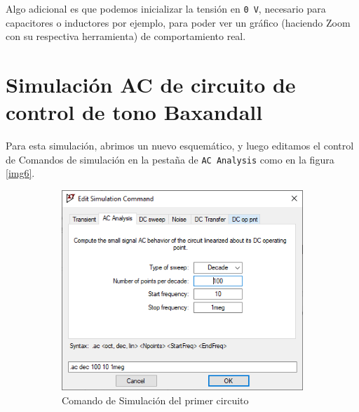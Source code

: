 \documentclass[a4paper]{article} %
\begin{document}
Algo adicional es que podemos inicializar la tensión en \texttt{0 V}, necesario para capacitores o inductores por ejemplo, para poder ver un gráfico (haciendo Zoom con su respectiva herramienta) de comportamiento real.


\section{Simulación AC de circuito de control de tono Baxandall}




Para esta simulación, abrimos un nuevo esquemático, y luego editamos el control de Comandos de simulación en la pestaña de \texttt{AC Analysis} como en la figura \eqref{img6}.

\begin{figure}
	\centering
	\begin{subfigure}[b]{0.45\textwidth}
		\centering %
		\includegraphics[scale=0.5]{IMAGENES/img6} %
		\caption{Comando de Simulación del primer circuito} %
		\label{img6} %
	\end{subfigure}
	\hfill
	\begin{subfigure}[b]{0.45\textwidth}
		\centering %

\end{subfigure}
\end{figure}
\end{document}
